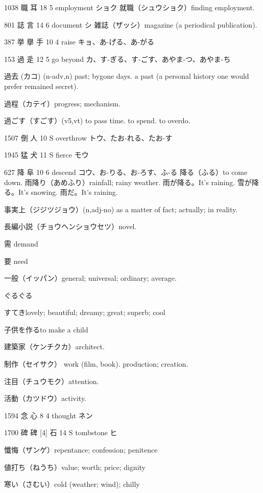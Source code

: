 1038	職		耳	18	5		employment	ショク
就職（シュウショク）finding employment.

801	誌		言	14	6		document	シ
雑誌（ザッシ）magazine (a periodical publication).

387	挙	擧	手	10	4		raise	キョ、あ-げる、あ-がる

153	過		辵	12	5		go beyond	カ、す-ぎる、す-ごす、あやま-つ、あやま-ち

過去 (カコ) (n-adv,n)
past; bygone days.
a past (a personal history one would prefer remained secret).

過程（カテイ）progress; mechanism.

過ごす（すごす）(v5,vt) to pass time. to spend. to overdo.

1507	倒		人	10	S		overthrow	トウ、たお-れる、たお-す

1945	猛		犬	11	S		fierce	モウ

627	降		阜	10	6		descend	コウ、お-りる、お-ろす、ふ-る
降る（ふる）to come down.
雨降り（あめふり）rainfall; rainy weather.
雨が降る。It's raining.
雪が降る。It's snowing.
雨だ。It's raining.

事実上（ジジツジョウ）(n,adj-no)
as a matter of fact; actually; in reality.

長編小説（チョウヘンショウセツ）novel.

需 demand

要 need

一般（イッパン）general; universal; ordinary; average.

ぐるぐる

すてきlovely; beautiful; dreamy; great; superb; cool


子供を作るto make a child

建築家（ケンチクカ）architect.

制作（セイサク）
work (film, book).
production; creation.

注目（チュウモク）attention.

活動（カツドウ）activity.

1594	念		心	8	4		thought	ネン

1700	碑	碑 [4]	石	14	S		tombstone	ヒ

懺悔（ザンゲ）repentance; confession; penitence

値打ち（ねうち）value; worth; price; dignity

寒い（さむい）cold (weather; wind); chilly

